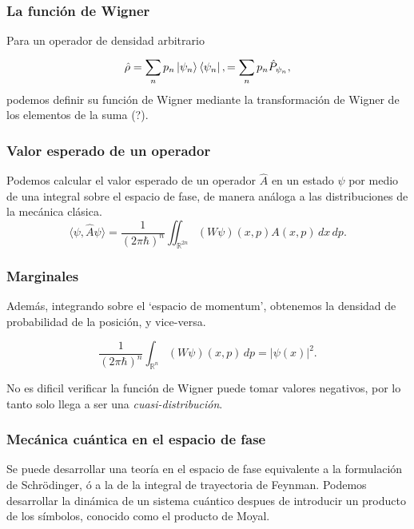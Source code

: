 \documentclass{beamer}
\DeclareMathOperator{\R}{\mathbb{R}}
\begin{document}
\begin{frame}
  \frametitle{La función de Wigner}

  Para un operador de densidad arbitrario
  \[
    \hat{\rho}
    = \sum_{n}^{} p_n \ket{\psi_n} \bra{\psi_n},
    = \sum_{n}^{} p_n \hat{P}_{\psi_n},
  \] 
  podemos definir su función de Wigner mediante la
  transformación de Wigner de los elementos de la suma (?).
\end{frame}

\begin{frame}
  \frametitle{Valor esperado de un operador}

  Podemos calcular el valor esperado de un operador
  $\hat{A}$ en un estado $\psi$ por medio de una integral
  sobre el espacio de fase, de manera análoga a las
  distribuciones de la mecánica clásica.
  \begin{equation}
    \langle \psi, \hat{A}\psi \rangle
    = \frac{1}{(2\pi\hbar)^{n}} 
    \iint_{\R^{2n}} (W\psi)(x,p) A(x,p) \, dx \, dp.
  \end{equation}
\end{frame}

\begin{frame}
  \frametitle{Marginales}

  Además, integrando sobre el `espacio de momentum',
  obtenemos la densidad de probabilidad de la posición, y
  vice-versa.

  \begin{equation}
    \frac{1}{(2\pi\hbar)^{n}} \int_{\R^{n}} (W\psi)(x,p) \,
    dp
    = |\psi(x)|^2.
  \end{equation}

  No es dificil verificar la función de Wigner puede tomar
  valores negativos, por lo tanto solo llega a ser una
  \textit{cuasi-distribución}.
\end{frame}

\begin{frame}
  \frametitle{Mecánica cuántica en el espacio de fase}

  Se puede desarrollar una teoría en el espacio de fase
  equivalente a la formulación de Schrödinger, ó a la de la
  integral de trayectoria de Feynman. Podemos desarrollar la
  dinámica de un sistema cuántico despues de introducir un
  producto de los símbolos, conocido como el producto de
  Moyal.
\end{frame}
\end{document}
